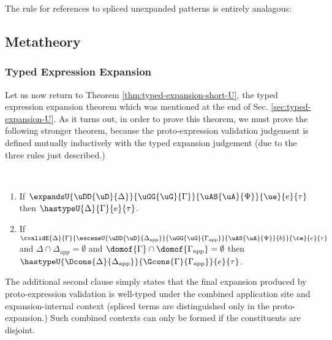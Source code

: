 \documentclass[acmlarge,review,anonymous]{acmart}\settopmatter{printfolios=true}
\begin{document}
The rule for references to spliced unexpanded patterns is entirely analagous:
\begin{mathpar}
\end{mathpar}

\subsection{Metatheory}\label{sec:s-metatheory}
\subsubsection{Typed Expression Expansion} Let us now return to Theorem \ref{thm:typed-expansion-short-U}, the typed expression expansion theorem which was mentioned at the end of Sec. \ref{sec:typed-expansion-U}. As it turns out, in order to prove this theorem, we must  prove the following stronger theorem, because the proto-expression validation judgement is defined mutually inductively with the typed expansion judgement (due to the three rules just described.)

\begin{theorem} ~
\begin{enumerate}[nolistsep]
\item If $\expandsU{\uDD{\uD}{\Delta}}{\uGG{\uG}{\Gamma}}{\uAS{\uA}{\Psi}}{\ue}{e}{\tau}$ then $\hastypeU{\Delta}{\Gamma}{e}{\tau}$.
\item If $\cvalidE{\Delta}{\Gamma}{\esceneU{\uDD{\uD}{\Delta_\text{app}}}{\uGG{\uG}{\Gamma_\text{app}}}{\uAS{\uA}{\Psi}}{b}}{\ce}{e}{\tau}$ and $\Delta \cap \Delta_\text{app} = \emptyset$ and $\domof{\Gamma} \cap \domof{\Gamma_\text{app}} = \emptyset$ then $\hastypeU{\Dcons{\Delta}{\Delta_\text{app}}}{\Gcons{\Gamma}{\Gamma_\text{app}}}{e}{\tau}$.
\end{enumerate}
\end{theorem}
The additional second clause simply states that the final expansion produced by proto-expression validation is well-typed under the combined application site and expansion-internal context (spliced terms are distinguished only in the proto-expansion.) Such combined contexts can only be formed if the constituents are disjoint.
\end{document}
